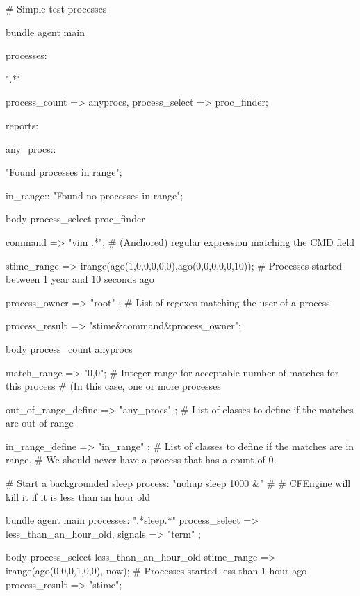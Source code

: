 \begin{codelisting}
\begin{code}
# Simple test processes

bundle agent main
{
  processes:

      ".*"

        process_count   => anyprocs,
        process_select  => proc_finder;


  reports:

    any_procs::

      "Found processes in range";

    in_range::
      "Found no processes in range";

}

body process_select proc_finder
{

        command => "vim .*";
        # (Anchored) regular expression matching the CMD field

        stime_range => irange(ago(1,0,0,0,0,0),ago(0,0,0,0,0,10));
        # Processes started between 1 year and 10 seconds ago

        process_owner => { "root" };
        # List of regexes matching the user of a process

        process_result => "stime&command&process_owner";

}

body process_count anyprocs
{
        match_range => "0,0";
      # Integer range for acceptable number of matches for this process
      # (In this case, one or more processes

        out_of_range_define => { "any_procs" };
      # List of classes to define if the matches are out of range

        in_range_define => { "in_range" };
      # List of classes to define if the matches are in range.
      # We should never have a process that has a count of 0.

}
\end{code}
\end{codelisting}
\begin{codelisting}
\begin{code}
# Start a backgrounded sleep process:  "nohup sleep 1000 &"
#
# CFEngine will kill it if it is less than an hour old

bundle agent main
{
  processes:
      ".*sleep.*"
        process_select  => less_than_an_hour_old,
        signals => { "term" };
}

body process_select less_than_an_hour_old
{
        stime_range => irange(ago(0,0,0,1,0,0), now);
      # Processes started less than 1 hour ago
        process_result => "stime";
}
\end{code}
\end{codelisting}